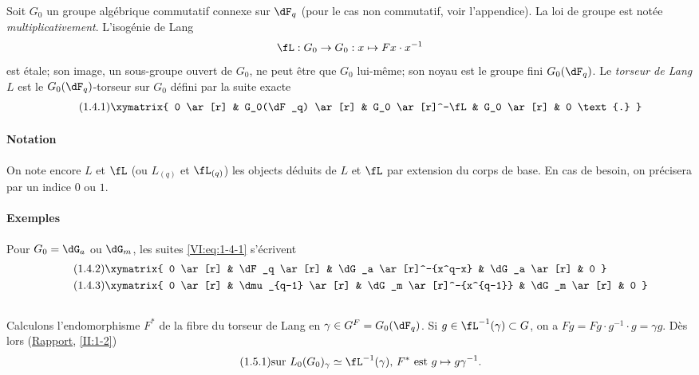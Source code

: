 Soit $G_0$ un groupe algébrique commutatif connexe sur $\dF_q$ (pour le cas 
non commutatif, voir l'appendice). La loi de groupe est notée 
\emph{multiplicativement}. L'isogénie de Lang 
\[
\fL:G_0 \to G_0: x\mapsto F x\cdot x^{-1}
\]
est étale; son image, un sous-groupe ouvert de $G_0$, ne peut être que 
$G_0$ lui-même; son noyau est le groupe fini $G_0(\dF_q)$. Le \emph{torseur 
de Lang} $L$ est le $G_0(\dF_q)$-torseur sur $G_0$ défini par la suite 
exacte 
\begin{equation*}\tag{1.4.1}\label{VI:eq:1-4-1}
\xymatrix{
  0 \ar[r] 
    & G_0(\dF_q) \ar[r] 
    & G_0 \ar[r]^-\fL 
    & G_0 \ar[r] 
    & 0 \text{.}
}
\end{equation*}


\paragraph{Notation}
On note encore $L$ et $\fL$ (ou $L_{(q)}$ et $\fL_{(q)}$) les objects déduits 
de $L$ et $\fL$ par extension du corps de base. En cas de besoin, on 
précisera par un indice $0$ ou $1$.


\paragraph{Exemples}
Pour $G_0=\dG_a$ ou $\dG_m$, les suites \eqref{VI:eq:1-4-1} s'écrivent 
\begin{align*}\tag{1.4.2}\label{VI:eq:1-4-2}
&\xymatrix{
  0 \ar[r] 
    & \dF_q \ar[r] 
    & \dG_a \ar[r]^-{x^q-x} 
    & \dG_a \ar[r] 
    & 0 
} \\
\tag{1.4.3}\label{VI:eq:1-4-3}
&\xymatrix{
  0 \ar[r] 
    & \dmu_{q-1} \ar[r] 
    & \dG_m \ar[r]^-{x^{q-1}} 
    & \dG_m \ar[r] 
    & 0
}
\end{align*}





\subsection{}\label{VI:1-5}

Calculons l'endomorphisme $F^\ast$ de la fibre du torseur de Lang en 
$\gamma\in G^F=G_0(\dF_q)$. Si $g\in \fL^{-1}(\gamma)\subset G$, on a 
$F g = F g\cdot g^{-1}\cdot g = \gamma g$. Dès lors (\hyperref[II]{Rapport}, 
\ref{II:1-2}) 
\begin{equation*}\tag{1.5.1}\label{VI:eq:1-5-1}
  \text{sur $L_0(G_0)_\gamma\simeq \fL^{-1}(\gamma)$, $F^\ast$ est $g\mapsto g\gamma^{-1}$.}
\end{equation*}





